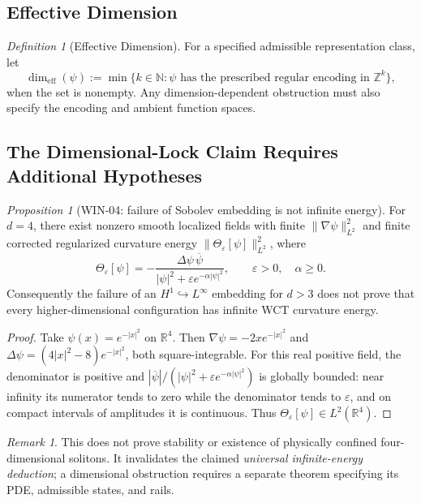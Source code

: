\documentclass[12pt]{article}
\theoremstyle{remark}
\newtheorem*{remark}{Remark}
\newtheorem{definition}[theorem]{Definition}
\newtheorem{proposition}[theorem]{Proposition}
\begin{document}
\subsection{Effective Dimension}
\begin{definition}[Effective Dimension]
\label{def:effective-dimension}
For a specified admissible representation class, let
\[
\dim_{\mathrm{eff}}(\psi):=\min\{k\in\mathbb N:
\psi\text{ has the prescribed regular encoding in }\mathbb Z^k\},
\]
when the set is nonempty. Any dimension-dependent obstruction must
also specify the encoding and ambient function spaces.
\end{definition}

\subsection{The Dimensional-Lock Claim Requires Additional Hypotheses}
\begin{proposition}[WIN-04: failure of Sobolev embedding is not infinite energy]
\label{lem:dim-lock}
For $d=4$, there exist nonzero smooth localized fields with finite
$\|\nabla\psi\|_{L^2}^2$ and finite corrected regularized curvature
energy $\|\Theta_\varepsilon[\psi]\|_{L^2}^2$, where
\[
\Theta_\varepsilon[\psi]=
-\frac{\Delta\psi\,\overline\psi}
{|\psi|^2+\varepsilon e^{-\alpha|\psi|^2}},
\qquad\varepsilon>0,\quad\alpha\ge0.
\]
Consequently the failure of an $H^1\hookrightarrow L^\infty$
embedding for $d>3$ does not prove that every higher-dimensional
configuration has infinite WCT curvature energy.
\end{proposition}
\begin{proof}
Take $\psi(x)=e^{-|x|^2}$ on $\mathbb R^4$.
Then $\nabla\psi=-2x e^{-|x|^2}$ and
$\Delta\psi=(4|x|^2-8)e^{-|x|^2}$, both square-integrable.
For this real positive field, the denominator is positive and
$|\overline\psi|/(|\psi|^2+\varepsilon e^{-\alpha|\psi|^2})$
is globally bounded: near infinity its numerator tends to zero
while the denominator tends to $\varepsilon$, and on compact
intervals of amplitudes it is continuous. Thus
$\Theta_\varepsilon[\psi]\in L^2(\mathbb R^4)$.
\end{proof}
\begin{remark}
This does not prove stability or existence of physically confined
four-dimensional solitons. It invalidates the claimed \emph{universal
infinite-energy deduction}; a dimensional obstruction requires a
separate theorem specifying its PDE, admissible states, and rails.
\end{remark}
\end{document}
